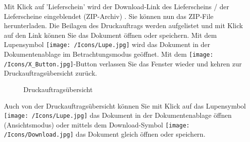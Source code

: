 Mit Klick auf 'Lieferschein'  wird der Download-Link des Lieferscheins / der Lieferscheine eingeblendet (ZIP-Archiv) . Sie können nun das ZIP-File herunterladen. Die Beilagen des Druckauftrags werden aufgelistet und mit Klick auf den Link  können Sie das Dokument öffnen oder speichern. Mit dem Lupensymbol \texttt{[image: /Icons/Lupe.jpg]}  wird das Dokument in der Dokumentenablage im Betrachtungsmodus geöffnet. Mit dem \texttt{[image: /Icons/X\_Button.jpg]}-Button  verlassen Sie das Fenster wieder und kehren zur Druckauftragsübersicht zurück.

\begin{figure}[H]
\caption{Druckauftragsübersicht}
\end{figure}

Auch von der Druckauftragsübersicht können Sie mit Klick auf das Lupensymbol \texttt{[image: /Icons/Lupe.jpg]}  das Dokument in der Dokumentenablage öffnen (Ansichtsmodus) oder mittels dem Download-Symbol \texttt{[image: /Icons/Download.jpg]}  das Dokument gleich öffnen oder speichern.

\vspace{\baselineskip}

